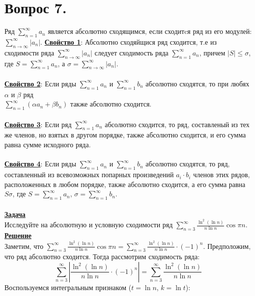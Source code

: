 \documentclass{report}
\begin{document}
\section{Вопрос 7.}
Ряд $\sum\limits_{n = 1}^\infty a_n$ является абсолютно сходящимся, если сходитcя ряд из его модулей: $\sum\limits_{n \to \infty}^\infty |a_n|$.
\textbf{\uline{Свойство 1}}: Абсолютно сходяйщися ряд сходится, т.е из сходимости ряда $\sum\limits_{n \to \infty}^\infty |a_n|$ следует сходимость ряда $\sum\limits_{n = 1}^\infty a_n$, причем $|S| \le \sigma$,  где $S = \sum\limits_{n = 1}^\infty a_n$, а $\sigma = \sum\limits_{n \to \infty}^\infty |a_n|$.\\\\
\textbf{\uline{Свойство 2}}: Если ряды  $\sum\limits_{n = 1}^\infty a_n$ и $\sum\limits_{n = 1}^\infty b_n$ абсолютно сходятся, то при любях $\alpha$ и $\beta$ ряд\\ $\sum\limits_{n = 1}^\infty (\alpha a_n + \beta b_n)$ также абсолютно сходится.\\\\
\textbf{\uline{Свойство 3}}: Если ряд $\sum\limits_{n = 1}^\infty a_n$ абсолютно сходится, то ряд, составленый из тех же членов, но взятых в другом порядке, также абсолютно сходится, и его сумма равна сумме исходного ряда.\\\\
\textbf{\uline{Свойство 4}}: Если ряды  $\sum\limits_{n = 1}^\infty a_n$ и $\sum\limits_{n = 1}^\infty b_n$ абсолютно сходятся, то ряд, составленный из всевозможных попарных произведений $a_i \cdot b_i$ членов этих рядов, расположенных в любом порядке, также абсолютно сходится, а его сумма равна $S\sigma$, где $S = \sum\limits_{n = 1}^\infty a_n$, $\sigma = \sum\limits_{n = 1}^\infty b_n$.\\\\
\textbf{\uline{Задача}}\\
Исследуйте на абсолютную и условную сходимости ряд $\sum\limits_{n = 3}^\infty \frac{\ln^2{(\ln{n})}}{n \ln{n}} \cos{\pi n}$.\\
\textbf{\uline{Решение}}\\
Заметим, что $\sum\limits_{n = 3}^\infty \frac{\ln^2{(\ln{n})}}{n \ln{n}} \cos{\pi n} = \sum\limits_{n = 3}^\infty \frac{\ln^2{(\ln{n})}}{n \ln{n}} \cdot (-1)^n$.
Предположим, что ряд абсолютно сходится. Тогда рассмотрим сходимость ряда:
$$\sum\limits_{n = 3}^\infty \left | \frac{\ln^2{(\ln{n})}}{n \ln{n}} \cdot (-1)^n \right | = \sum\limits_{n = 3}^\infty \frac{\ln^2{(\ln{n})}}{n \ln{n}}$$
Воспользуемся интегральным признаком ($t = \ln{n}$, $k = \ln{t}$):
\end{document}
